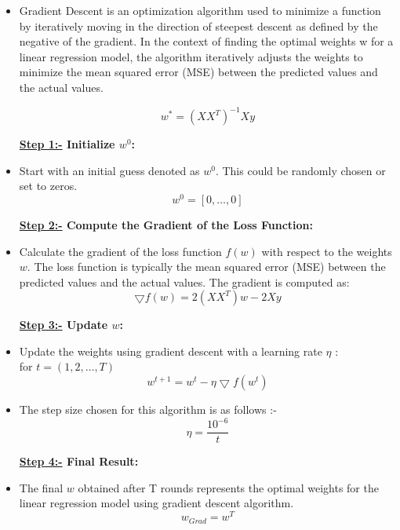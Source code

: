 \documentclass[12pt, a4paper]{article}
\begin{document}
\begin{itemize}
    \item \large Gradient Descent is an optimization algorithm used to minimize a function by iteratively moving in the direction of steepest descent as defined by the negative of the gradient. In the context of finding the optimal weights w for a linear regression model, the algorithm iteratively adjusts the weights to minimize the mean squared error (MSE) between the predicted values and the actual values.
    
    \large \[w^* = (XX^T)^{-1}Xy\]

    \large \textbf{\underline{Step 1:-} Initialize $w^0$:}
    \item \large Start with an initial guess denoted as $w^0$. This could be randomly chosen or set to zeros.
    \large \[ w^0 = [0,\dots,0]\]

    \large \textbf{\underline{Step 2:-} Compute the Gradient of the Loss Function:}
    \item \large Calculate the gradient of the loss function $f(w)$ with respect to the weights $w$. The loss function is typically the mean squared error (MSE) between the predicted values and the actual values. The gradient is computed as:
    \large \[\bigtriangledown f(w) = 2(XX^T)w - 2Xy\]

    \large \textbf{\underline{Step 3:-} Update $w$:}
    \item \large Update the weights using gradient descent with a learning rate $\eta$ :\\
    \large for \(t = (1,2,\dots,T)\)
    \large \[ w^{t+1} = w^t - \eta\bigtriangledown f(w^t)\]
    \item \large The step size chosen for this algorithm is as follows :-
    \large \[\eta = \frac{10^{-6}}{{t}}\]

    \large \textbf{\underline{Step 4:-} Final Result:}
    \item \large The final $w$ obtained after T rounds represents the optimal weights for the linear regression model using gradient descent algorithm.
    \large \[ w_{Grad} = w^T\]


\end{itemize}
\end{document}
